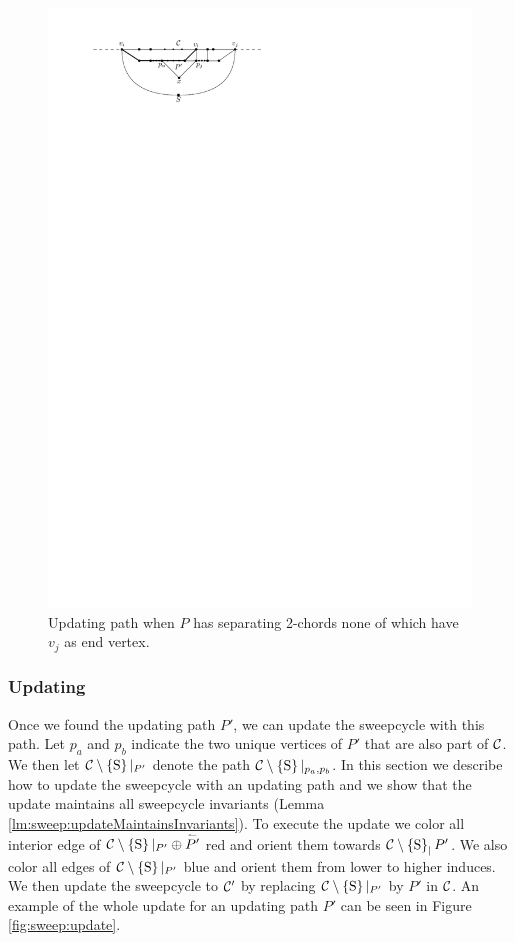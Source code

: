       \begin{figure}[b]
        \centering
        \includegraphics[scale=1]{unifiedAlgo/img/sweep/cases/free2chord}
        \caption{Updating path when $P$ has separating 2-chords none of which have $v_j$ as end vertex.}
        \label{fig:sweep:free2chord}
      \end{figure}

\subsubsection{Updating}
  \label{sss:sweep:update}
  Once we found the updating path $P'$, we can update the sweepcycle with this path.  Let $p_a$ and $p_b$ indicate the two unique vertices of $P'$ that are also part of $\mathcal{C}$. We then let $\mathcal{C} \setminus \left\lbrace {\mathrm{S}} \right\rbrace|_{P'}$ denote the path $\mathcal{C} \setminus \left\lbrace {\mathrm{S}} \right\rbrace|_{p_a, p_b}$.
  In this section we describe how to update the sweepcycle with an updating path and we show that the update maintains all sweepcycle invariants (Lemma \ref{lm:sweep:updateMaintainsInvariants}).
  To execute the update we color all interior edge of $\mathcal{C} \setminus \left\lbrace {\mathrm{S}} \right\rbrace|_{P'} \oplus \accentset{\leftharpoonup}{P'}$ red and orient them towards $\mathcal{C} \setminus \left\lbrace {\mathrm{S}} \right\rbrace_|{P'}$.
  We also color all edges of $\mathcal{C} \setminus \left\lbrace {\mathrm{S}} \right\rbrace|_{P'}$  blue and orient them from lower to higher induces.
  We then update the sweepcycle to $\mathcal{C}'$ by replacing $\mathcal{C} \setminus \left\lbrace {\mathrm{S}} \right\rbrace|_{P'}$ by $P'$ in $\mathcal{C}$.
  An example of the whole update for an updating path $P'$ can be seen in Figure \ref{fig:sweep:update}.

